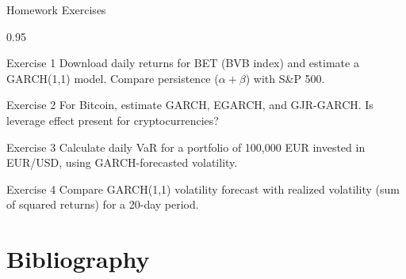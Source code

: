 \documentclass[9pt, aspectratio=169, t]{beamer}
\begin{document}
\begin{frame}{Homework Exercises}
    \begin{cminipage}{0.95\textwidth}
    {\small
    \begin{block}{Exercise 1}
        Download daily returns for BET (BVB index) and estimate a GARCH(1,1) model. Compare persistence ($\alpha + \beta$) with S\&P 500.
    \end{block}

    \begin{block}{Exercise 2}
        For Bitcoin, estimate GARCH, EGARCH, and GJR-GARCH. Is leverage effect present for cryptocurrencies?
    \end{block}

    \begin{block}{Exercise 3}
        Calculate daily VaR for a portfolio of 100,000 EUR invested in EUR/USD, using GARCH-forecasted volatility.
    \end{block}

    \begin{block}{Exercise 4}
        Compare GARCH(1,1) volatility forecast with realized volatility (sum of squared returns) for a 20-day period.
    \end{block}
    }
    \end{cminipage}
\end{frame}

\section{Bibliography}
\end{document}
